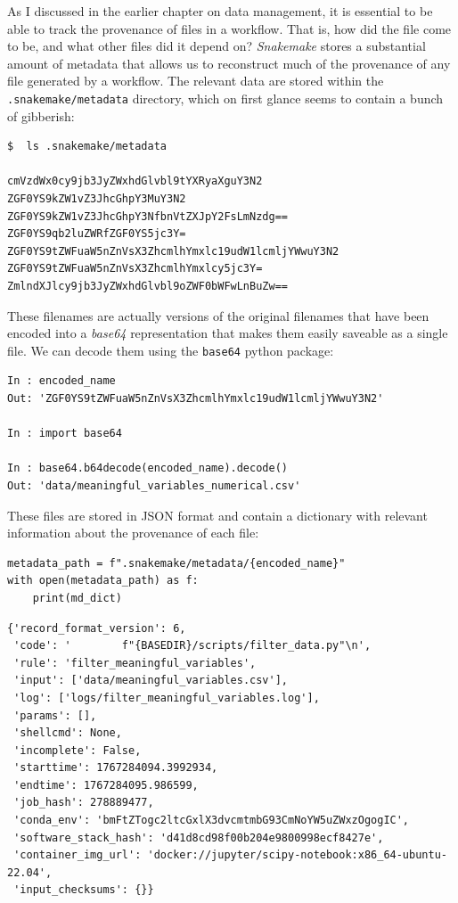 As I discussed in the earlier chapter on data management, it is essential to be able to track the provenance of files in a workflow.  That is, how did the file come to be, and what other files did it depend on?  \textit{Snakemake} stores a substantial amount of metadata that allows us to reconstruct much of the provenance of any file generated by a workflow.  The relevant data are stored within the \texttt{.snakemake/metadata} directory, which on first glance seems to contain a bunch of gibberish:

\begin{lstlisting}[style=shell]
$  ls .snakemake/metadata

cmVzdWx0cy9jb3JyZWxhdGlvbl9tYXRyaXguY3N2
ZGF0YS9kZW1vZ3JhcGhpY3MuY3N2
ZGF0YS9kZW1vZ3JhcGhpY3NfbnVtZXJpY2FsLmNzdg==
ZGF0YS9qb2luZWRfZGF0YS5jc3Y=
ZGF0YS9tZWFuaW5nZnVsX3ZhcmlhYmxlc19udW1lcmljYWwuY3N2
ZGF0YS9tZWFuaW5nZnVsX3ZhcmlhYmxlcy5jc3Y=
ZmlndXJlcy9jb3JyZWxhdGlvbl9oZWF0bWFwLnBuZw==
\end{lstlisting}

These filenames are actually versions of the original filenames that have been encoded into a \textit{base64} representation that makes them easily saveable as a single file.  We can decode them using the \texttt{base64} python package:

\begin{lstlisting}[style=repl]
In : encoded_name
Out: 'ZGF0YS9tZWFuaW5nZnVsX3ZhcmlhYmxlc19udW1lcmljYWwuY3N2'

In : import base64

In : base64.b64decode(encoded_name).decode()
Out: 'data/meaningful_variables_numerical.csv'
\end{lstlisting}

These files are stored in JSON format and contain a dictionary with relevant information about the provenance of each file:

\begin{lstlisting}[style=Pythonshort]
metadata_path = f".snakemake/metadata/{encoded_name}"
with open(metadata_path) as f:
    print(md_dict)
\end{lstlisting}

\begin{lstlisting}[style=json]
{'record_format_version': 6,
 'code': '        f"{BASEDIR}/scripts/filter_data.py"\n',
 'rule': 'filter_meaningful_variables',
 'input': ['data/meaningful_variables.csv'],
 'log': ['logs/filter_meaningful_variables.log'],
 'params': [],
 'shellcmd': None,
 'incomplete': False,
 'starttime': 1767284094.3992934,
 'endtime': 1767284095.986599,
 'job_hash': 278889477,
 'conda_env': 'bmFtZTogc2ltcGxlX3dvcmtmbG93CmNoYW5uZWxzOgogIC',
 'software_stack_hash': 'd41d8cd98f00b204e9800998ecf8427e',
 'container_img_url': 'docker://jupyter/scipy-notebook:x86_64-ubuntu-22.04',
 'input_checksums': {}}
\end{lstlisting}

